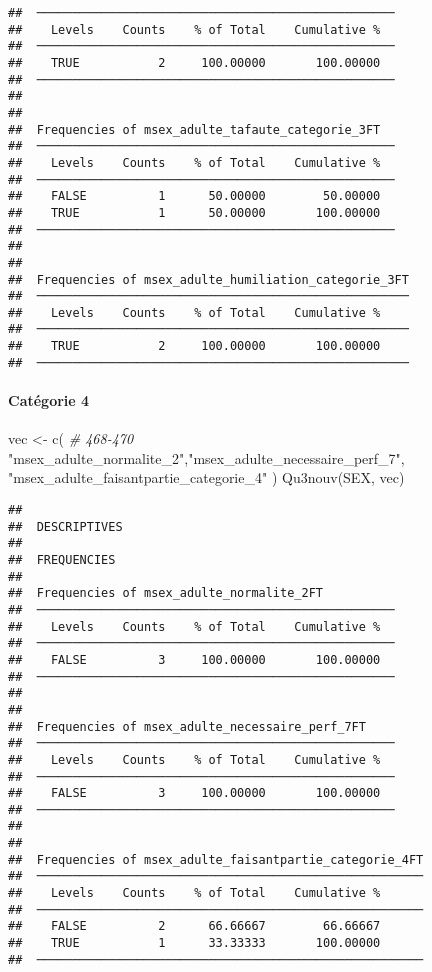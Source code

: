 \documentclass[
]{article}
\newenvironment{Shaded}{\begin{snugshade}}{\end{snugshade}}
\newcommand{\CommentTok}[1]{\textcolor[rgb]{0.56,0.35,0.01}{\textit{#1}}}
\newcommand{\FunctionTok}[1]{\textcolor[rgb]{0.00,0.00,0.00}{#1}}
\newcommand{\NormalTok}[1]{#1}
\newcommand{\OtherTok}[1]{\textcolor[rgb]{0.56,0.35,0.01}{#1}}
\newcommand{\StringTok}[1]{\textcolor[rgb]{0.31,0.60,0.02}{#1}}
\begin{document}
\begin{verbatim}
##  ────────────────────────────────────────────────── 
##    Levels    Counts    % of Total    Cumulative %   
##  ────────────────────────────────────────────────── 
##    TRUE           2     100.00000       100.00000   
##  ────────────────────────────────────────────────── 
## 
## 
##  Frequencies of msex_adulte_tafaute_categorie_3FT   
##  ────────────────────────────────────────────────── 
##    Levels    Counts    % of Total    Cumulative %   
##  ────────────────────────────────────────────────── 
##    FALSE          1      50.00000        50.00000   
##    TRUE           1      50.00000       100.00000   
##  ────────────────────────────────────────────────── 
## 
## 
##  Frequencies of msex_adulte_humiliation_categorie_3FT 
##  ──────────────────────────────────────────────────── 
##    Levels    Counts    % of Total    Cumulative %   
##  ──────────────────────────────────────────────────── 
##    TRUE           2     100.00000       100.00000   
##  ────────────────────────────────────────────────────
\end{verbatim}

\hypertarget{catuxe9gorie-4-4}{%
\paragraph{Catégorie 4}\label{catuxe9gorie-4-4}}

\begin{Shaded}
\begin{Highlighting}[]
\NormalTok{vec }\OtherTok{\textless{}{-}} \FunctionTok{c}\NormalTok{(  }\CommentTok{\# 468{-}470}
  \StringTok{"msex\_adulte\_normalite\_2"}\NormalTok{,}\StringTok{"msex\_adulte\_necessaire\_perf\_7"}\NormalTok{, }\StringTok{"msex\_adulte\_faisantpartie\_categorie\_4"}
\NormalTok{)}
\FunctionTok{Qu3nouv}\NormalTok{(SEX, vec)}
\end{Highlighting}
\end{Shaded}

\begin{verbatim}
## 
##  DESCRIPTIVES
## 
##  FREQUENCIES
## 
##  Frequencies of msex_adulte_normalite_2FT           
##  ────────────────────────────────────────────────── 
##    Levels    Counts    % of Total    Cumulative %   
##  ────────────────────────────────────────────────── 
##    FALSE          3     100.00000       100.00000   
##  ────────────────────────────────────────────────── 
## 
## 
##  Frequencies of msex_adulte_necessaire_perf_7FT     
##  ────────────────────────────────────────────────── 
##    Levels    Counts    % of Total    Cumulative %   
##  ────────────────────────────────────────────────── 
##    FALSE          3     100.00000       100.00000   
##  ────────────────────────────────────────────────── 
## 
## 
##  Frequencies of msex_adulte_faisantpartie_categorie_4FT 
##  ────────────────────────────────────────────────────── 
##    Levels    Counts    % of Total    Cumulative %   
##  ────────────────────────────────────────────────────── 
##    FALSE          2      66.66667        66.66667   
##    TRUE           1      33.33333       100.00000   
##  ──────────────────────────────────────────────────────
\end{verbatim}
\end{document}
